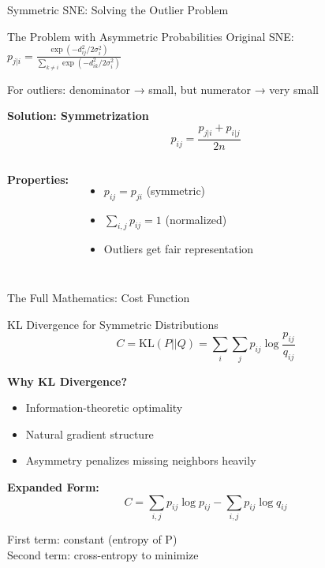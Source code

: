 \begin{frame}{Symmetric SNE: Solving the Outlier Problem}
\begin{block}{The Problem with Asymmetric Probabilities}
Original SNE: $p_{j|i} = \frac{\exp(-d_{ij}^2/2\sigma_i^2)}{\sum_{k \neq i}\exp(-d_{ik}^2/2\sigma_i^2)}$

For outliers: denominator → small, but numerator → very small
\end{block}

\textbf{Solution: Symmetrization}
$$p_{ij} = \frac{p_{j|i} + p_{i|j}}{2n}$$

\begin{columns}
\textbf{Properties:}
\begin{itemize}
\item $p_{ij} = p_{ji}$ (symmetric)
\item $\sum_{i,j} p_{ij} = 1$ (normalized)
\item Outliers get fair representation
\end{itemize}

\begin{center}
\end{center}
\end{columns}

\end{frame}

\begin{frame}{The Full Mathematics: Cost Function}
\begin{block}{KL Divergence for Symmetric Distributions}
$$C = \text{KL}(P||Q) = \sum_{i} \sum_{j} p_{ij} \log \frac{p_{ij}}{q_{ij}}$$
\end{block}

\textbf{Why KL Divergence?}
\begin{itemize}
\item Information-theoretic optimality
\item Natural gradient structure
\item Asymmetry penalizes missing neighbors heavily
\end{itemize}

\textbf{Expanded Form:}
$$C = \sum_{i,j} p_{ij} \log p_{ij} - \sum_{i,j} p_{ij} \log q_{ij}$$

First term: constant (entropy of P)\\
Second term: cross-entropy to minimize
\end{frame}


